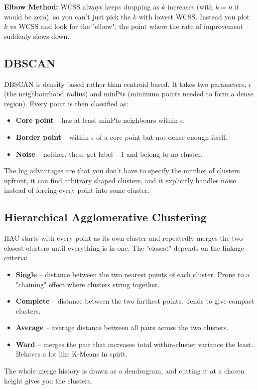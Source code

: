 \documentclass[12pt,a4paper]{article}
\begin{document}
\textbf{Elbow Method:} WCSS always keeps dropping as $k$ increases (with $k=n$ it would be zero), so you can't just pick the $k$ with lowest WCSS. Instead you plot $k$ vs WCSS and look for the "elbow", the point where the rate of improvement suddenly slows down.

\subsection*{DBSCAN}
DBSCAN is density based rather than centroid based. It takes two parameters, $\epsilon$ (the neighbourhood radius) and minPts (minimum points needed to form a dense region). Every point is then classified as:
\begin{itemize}
\item \textbf{Core point} -- has at least minPts neighbours within $\epsilon$.
\item \textbf{Border point} -- within $\epsilon$ of a core point but not dense enough itself.
\item \textbf{Noise} -- neither, these get label $-1$ and belong to no cluster.
\end{itemize}
The big advantages are that you don't have to specify the number of clusters upfront, it can find arbitrary shaped clusters, and it explicitly handles noise instead of forcing every point into some cluster.

\subsection*{Hierarchical Agglomerative Clustering}
HAC starts with every point as its own cluster and repeatedly merges the two closest clusters until everything is in one. The "closest" depends on the linkage criteria:
\begin{itemize}
\item \textbf{Single} -- distance between the two nearest points of each cluster. Prone to a "chaining" effect where clusters string together.
\item \textbf{Complete} -- distance between the two farthest points. Tends to give compact clusters.
\item \textbf{Average} -- average distance between all pairs across the two clusters.
\item \textbf{Ward} -- merges the pair that increases total within-cluster variance the least. Behaves a lot like K-Means in spirit.
\end{itemize}
The whole merge history is drawn as a dendrogram, and cutting it at a chosen height gives you the clusters.
\end{document}
